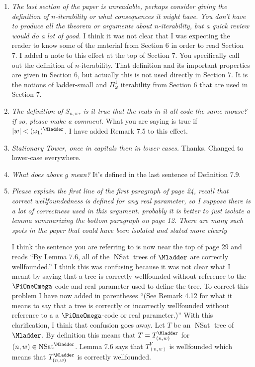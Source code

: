 \documentclass[oneside,12pt]{amsart}
\DeclareMathOperator{\NSat}{NSat}
\begin{document}
\begin{enumerate} [label=\arabic*)]
\item \emph{The last section of the paper is unreadable, perhaps consider giving the definition of $n$-iterability or what consequences it might have. You don’t have to produce all the theorem
or arguments about $n$-iterability, but a quick review would do a lot of good.}
 I think it was not clear that I was expecting the reader to know some of the material from Section 6 in order to read Section 7. I added a note to this effect at the top of Section 7. You specifically call out the definition of $n$-iterability. That definition and its important properties are given in Section 6, but actually this is not used directly in Section 7. It is the notions of ladder-small and $\Pi^1_{\omega}$ iterability from Section 6 that are used in Section 7.

 \item \emph{ The definition of $S_{n,w}$, is it true that the reals in it all code the same mouse? if so, please make a comment.}
 What you are saying is true if $|w| < (\omega_1)^{\Mladder}$. I have added Remark 7.5 to this effect.

 \item \emph{Stationary Tower, once in capitals then in lower cases.}
  Thanks. Changed to lower-case everywhere.


\item \emph{What does above $g$ mean?} It’s defined in the last sentence of Definition 7.9.

\item \emph{Please explain the first line of the first paragraph of page 24, recall that correct wellfoundedness is defined for any real parameter, so I suppose there is a lot of correctness
used in this argument. probably it is better to just isolate a lemma summarizing the
bottom paragraph on page 12. There are many such spots in the paper that could have
been isolated and stated more clearly}
 
 I think the sentence you are referring to is now near the top of page 29 and reads ``By Lemma 7.6, all of the $\NSat$ trees of $\Mladder$
are correctly wellfounded.'' I think this was confusing because it was not clear what I meant by saying that a tree is correctly wellfounded without reference to the $\PiOneOmega$ code and real parameter used to define the tree. To correct this problem I have now added in parentheses  ``(See Remark 4.12 for what it means to say that a tree is correctly or incorrectly wellfounded without reference to a a $\PiOneOmega$-code or real parameter.)'' With this clarification, I think that confusion goes away. 
Let $T$ be an $\NSat$ tree of $\Mladder$. By definition this means that 
$T = T^{\Mladder}_{(n,w)}$ for $(n,w) \in \NSat^{\Mladder}$. Lemma 7.6 says that 
$T^V_{(n,w)}$ is wellfounded which means that 
$T^{\Mladder}_{(n,w)}$ is correctly wellfounded.


\end{enumerate}
\end{document}
